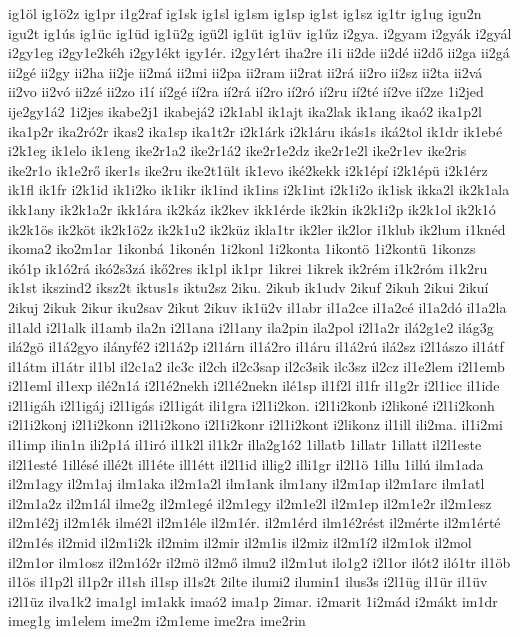 {ig1öl
ig1ö2z
ig1pr
i1g2raf
ig1sk
ig1sl
ig1sm
ig1sp
ig1st
ig1sz
ig1tr
ig1ug
igu2n
igu2t
ig1ús
ig1üc
ig1üd
ig1ü2g
igü2l
ig1üt
ig1üv
ig1űz
i2gya.
i2gyam
i2gyák
i2gyál
i2gy1eg
i2gy1e2kéh
i2gy1ékt
igy1ér.
i2gy1ért
iha2re
i1i
ii2de
ii2dé
ii2dő
ii2ga
ii2gá
ii2gé
ii2gy
ii2ha
ii2je
ii2má
ii2mi
ii2pa
ii2ram
ii2rat
ii2rá
ii2ro
ii2sz
ii2ta
ii2vá
ii2vo
ii2vó
ii2zé
ii2zo
i1í
ií2gé
ií2ra
ií2rá
ií2ro
ií2ró
ií2ru
ií2té
ií2ve
ií2ze
1i2jed
ije2gy1á2
1i2jes
ikabe2j1
ikabejá2
i2k1abl
ik1ajt
ika2lak
ik1ang
ikaó2
ika1p2l
ika1p2r
ika2ró2r
ikas2
ika1sp
ika1t2r
i2k1árk
i2k1áru
ikás1s
iká2tol
ik1dr
ik1ebé
i2k1eg
ik1elo
ik1eng
ike2r1a2
ike2r1á2
ike2r1e2dz
ike2r1e2l
ike2r1ev
ike2ris
ike2r1o
ik1e2rő
iker1s
ike2ru
ike2t1ült
ik1evo
iké2kekk
i2k1épí
i2k1épü
i2k1érz
ik1fl
ik1fr
i2k1id
ik1i2ko
ik1ikr
ik1ind
ik1ins
i2k1int
i2k1i2o
ik1isk
ikka2l
ik2k1ala
ikk1any
ik2k1a2r
ikk1ára
ik2káz
ik2kev
ikk1érde
ik2kin
ik2k1i2p
ik2k1ol
ik2k1ó
ik2k1ös
ik2köt
ik2k1ö2z
ik2k1u2
ik2küz
ikla1tr
ik2ler
ik2lor
i1klub
ik2lum
i1knéd
ikoma2
iko2m1ar
1ikonbá
1ikonén
1i2konl
1i2konta
1ikontö
1i2kontü
1ikonzs
ikó1p
ik1ó2rá
ikó2s3zá
ikő2res
ik1pl
ik1pr
1ikrei
1ikrek
ik2rém
i1k2róm
i1k2ru
ik1st
ikszind2
iksz2t
iktus1s
iktu2sz
2iku.
2ikub
ik1udv
2ikuf
2ikuh
2ikui
2ikuí
2ikuj
2ikuk
2ikur
iku2sav
2ikut
2ikuv
ik1ü2v
il1abr
il1a2ce
il1a2cé
il1a2dó
il1a2la
il1ald
i2l1alk
il1amb
ila2n
i2l1ana
i2l1any
ila2pin
ila2pol
i2l1a2r
ilá2g1e2
ilág3g
ilá2gö
il1á2gyo
ilányfé2
i2l1á2p
i2l1árn
il1á2ro
il1áru
il1á2rú
ilá2sz
i2l1ászo
il1átf
il1átm
il1átr
il1bl
il2c1a2
ilc3c
il2ch
il2c3sap
il2c3sik
ilc3sz
il2cz
il1e2lem
i2l1emb
i2l1eml
il1exp
ilé2n1á
i2l1é2nekh
i2l1é2nekn
ilé1sp
il1f2l
il1fr
il1g2r
i2l1icc
il1ide
i2l1igáh
i2l1igáj
i2l1igás
i2l1igát
ili1gra
i2l1i2kon.
i2l1i2konb
i2likoné
i2l1i2konh
i2l1i2konj
i2l1i2konn
i2l1i2kono
i2l1i2konr
i2l1i2kont
i2likonz
il1ill
ili2ma.
il1i2mi
il1imp
ilin1n
ili2p1á
il1iró
il1k2l
il1k2r
illa2g1ó2
1illatb
1illatr
1illatt
il2l1este
il2l1esté
1illésé
illé2t
ill1éte
ill1étt
il2l1id
illig2
illi1gr
il2l1ö
1illu
1illú
ilm1ada
il2m1agy
il2m1aj
ilm1aka
il2m1a2l
ilm1ank
ilm1any
il2m1ap
il2m1arc
ilm1atl
il2m1a2z
il2m1ál
ilme2g
il2m1egé
il2m1egy
il2m1e2l
il2m1ep
il2m1e2r
il2m1esz
il2m1é2j
il2m1ék
ilmé2l
il2m1éle
il2m1ér.
il2m1érd
ilm1é2rést
il2mérte
il2m1érté
il2m1és
il2mid
il2m1i2k
il2mim
il2mir
il2m1is
il2miz
il2m1í2
il2m1ok
il2mol
il2m1or
ilm1osz
il2m1ó2r
il2mö
il2mő
ilmu2
il2m1ut
ilo1g2
i2l1or
ilót2
iló1tr
il1öb
il1ös
il1p2l
il1p2r
il1sh
il1sp
il1s2t
2ilte
ilumi2
ilumin1
ilus3s
i2l1üg
il1ür
il1üv
i2l1üz
ilva1k2
ima1gl
im1akk
imaó2
ima1p
2imar.
i2marit
1i2mád
i2mákt
im1dr
imeg1g
im1elem
ime2m
i2m1eme
ime2ra
ime2rin
}
